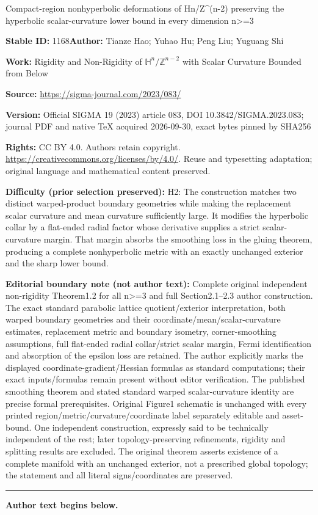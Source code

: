 \documentclass[11pt]{article}
\numberwithin{equation}{section}
\numberwithin{equation}{section}
\begin{document}
\begin{center}\Large Compact-region nonhyperbolic deformations of Hn/Z\textasciicircum{}(n-2) preserving the hyperbolic scalar-curvature lower bound in every dimension n>=3\end{center}
\noindent\textbf{Stable ID:} 1168\quad\textbf{Author:} Tianze Hao; Yuhao Hu; Peng Liu; Yuguang Shi\par
\noindent\textbf{Work:} Rigidity and Non-Rigidity of $\mathbb{H}^n/\mathbb{Z}^{n-2}$ with Scalar Curvature Bounded from Below\par
\noindent\textbf{Source:} \url{https://sigma-journal.com/2023/083/}\par
\noindent\textbf{Version:} Official SIGMA 19 (2023) article 083, DOI 10.3842/SIGMA.2023.083; journal PDF and native TeX acquired 2026-09-30, exact bytes pinned by SHA256\par
\noindent\textbf{Rights:} CC BY 4.0. Authors retain copyright. \url{https://creativecommons.org/licenses/by/4.0/}. Reuse and typesetting adaptation; original language and mathematical content preserved.\par
\noindent\textbf{Difficulty (prior selection preserved):} {\CJKfont H2: The construction matches two distinct warped-product boundary geometries while making the replacement scalar curvature and mean curvature sufficiently large. It modifies the hyperbolic collar by a flat-ended radial factor whose derivative supplies a strict scalar-curvature margin. That margin absorbs the smoothing loss in the gluing theorem, producing a complete nonhyperbolic metric with an exactly unchanged exterior and the sharp lower bound.}\par
\medskip\noindent\textbf{Editorial boundary note (not author text):} Complete original independent non-rigidity Theorem1.2 for all n>=3 and full Section2.1–2.3 author construction. The exact standard parabolic lattice quotient/exterior interpretation, both warped boundary geometries and their coordinate/mean/scalar-curvature estimates, replacement metric and boundary isometry, corner-smoothing assumptions, full flat-ended radial collar/strict scalar margin, Fermi identification and absorption of the epsilon loss are retained. The author explicitly marks the displayed coordinate-gradient/Hessian formulas as standard computations; their exact inputs/formulas remain present without editor verification. The published smoothing theorem and stated standard warped scalar-curvature identity are precise formal prerequisites. Original Figure1 schematic is unchanged with every printed region/metric/curvature/coordinate label separately editable and asset-bound. One independent construction, expressly said to be technically independent of the rest; later topology-preserving refinements, rigidity and splitting results are excluded. The original theorem asserts existence of a complete manifold with an unchanged exterior, not a prescribed global topology; the statement and all literal signs/coordinates are preserved.\par
\medskip\hrule\medskip\noindent\textbf{Author text begins below.}\par
\end{document}
